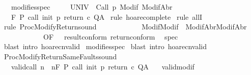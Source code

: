 \begin{isabellebody}
\ \ \ modifies{\isacharunderscore}spec{\isacharcolon}\ \ \isanewline
\ \ {\isachardoublequoteopen}{\isasymforall}{\isasymsigma}{\isachardot}\ {\isasymGamma}{\isacharcomma}{\isasymTheta}{\isasymturnstile}\isactrlbsub {\isacharslash}UNIV\isactrlesub \ {\isacharbraceleft}{\isasymsigma}{\isacharbraceright}\ Call\ p\ {\isacharparenleft}Modif\ {\isasymsigma}{\isacharparenright}{\isacharcomma}{\isacharparenleft}ModifAbr\ {\isasymsigma}{\isacharparenright}{\isachardoublequoteclose}\isanewline
\ \ \ {\isachardoublequoteopen}{\isasymGamma}{\isacharcomma}{\isasymTheta}{\isasymturnstile}\isactrlbsub {\isacharslash}F\isactrlesub \ P\ {\isacharparenleft}call\ init\ p\ return\ c{\isacharparenright}\ Q{\isacharcomma}A{\isachardoublequoteclose}\isanewline
%
\isadelimproof
%
\endisadelimproof
%
\isatagproof
{}\isamarkupfalse%
\ {\isacharparenleft}rule\ hoare{\isacharunderscore}complete{\isacharprime}{\isacharparenright}\isanewline
{}\isamarkupfalse%
\ {\isacharparenleft}rule\ allI{\isacharparenright}\isanewline
{}\isamarkupfalse%
\ {\isacharparenleft}rule\ ProcModifyReturn{\isacharunderscore}sound\ \isanewline
\ \ \ \ \ \ \ \ \ \ {\isacharbrackleft}\ Modif{\isacharequal}Modif\ \ ModifAbr{\isacharequal}ModifAbr{\isacharcomma}\ \isanewline
\ \ \ \ \ \ \ \ \ \ \ \ OF\ {\isacharunderscore}\ {\isacharunderscore}\ result{\isacharunderscore}conform\ return{\isacharunderscore}conform{\isacharbrackright}\ {\isacharparenright}\isanewline
{}\isamarkupfalse%
\ spec\isanewline
{}\isamarkupfalse%
\ {\isacharparenleft}blast\ intro{\isacharcolon}\ hoare{\isacharunderscore}cnvalid{\isacharparenright}\isanewline
{}\isamarkupfalse%
\ modifies{\isacharunderscore}spec\isanewline
{}\isamarkupfalse%
\ {\isacharparenleft}blast\ intro{\isacharcolon}\ hoare{\isacharunderscore}cnvalid{\isacharparenright}\isanewline
{}\isamarkupfalse%
%
\endisatagproof
{\isafoldproof}%
%
\isadelimproof
\isanewline
%
\endisadelimproof
\isanewline
{}\isamarkupfalse%
\ ProcModifyReturnSameFaults{\isacharunderscore}sound{\isacharcolon}\isanewline
\ \ \ valid{\isacharunderscore}call{\isacharcolon}\ {\isachardoublequoteopen}{\isasymforall}n{\isachardot}\ {\isasymGamma}{\isacharcomma}{\isasymTheta}\ {\isasymTurnstile}n{\isacharcolon}\isactrlbsub {\isacharslash}F\isactrlesub \ P\ call\ init\ p\ return{\isacharprime}\ c\ Q{\isacharcomma}A{\isachardoublequoteclose}\isanewline
\ \ \ valid{\isacharunderscore}modif{\isacharcolon}\ \isanewline

\end{isabellebody}
